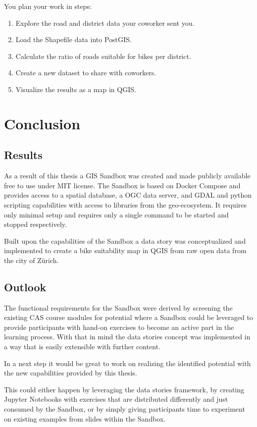 \documentclass[11pt, a4paper, oneside, parskip=full-]{scrartcl}
\begin{document}
You plan your work in steps:
\begin{enumerate}
  \item Explore the road and district data your coworker sent you.
  \item Load the Shapefile data into PostGIS.
  \item Calculate the ratio of roads suitable for bikes per district.
  \item Create a new dataset to share with coworkers.
  \item Visualize the results as a map in QGIS.
\end{enumerate}

\section{Conclusion}

\subsection{Results}
As a result of this thesis a GIS Sandbox was created and made publicly available
free to use under MIT license\cite{osgeostacksandbox}. The Sandbox is based on
Docker Compose and provides access to a spatial database, a OGC data server, and
GDAL and python scripting capabilities with access to libraries from the
geo-ecosystem. It requires only minimal setup and requires only a single command
to be started and stopped respectively.

Built upon the capabilities of the Sandbox a data story was
conceptualized and implemented to create a bike suitability map in QGIS from raw
open data from the city of Zürich.

\subsection{Outlook}
The functional requirements for the Sandbox were derived by screening the
existing CAS course modules for potential where a Sandbox could be leveraged to
provide participants with hand-on exercises to become an active part in the
learning process. With that in mind the data stories concept was implemented in
a way that is easily extensible with further content.

In a next step it would be great to work on realizing the identified potential
with the new capabilities provided by this thesis.

This could either happen by leveraging the data stories framework, by creating
Jupyter Notebooks with exercises that are distributed differently and just
consumed by the Sandbox, or by simply giving participants time to experiment on
existing examples from slides within the Sandbox.

\printbibliography
\end{document}
